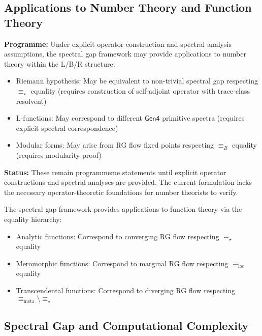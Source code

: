 \subsection{Applications to Number Theory and Function Theory}

\begin{conjecture}
\label{conj:number-theory-lbr}
\textbf{Programme:} Under explicit operator construction and spectral analysis assumptions, the spectral gap framework may provide applications to number theory within the L/B/R structure:
\begin{itemize}
\item Riemann hypothesis: May be equivalent to non-trivial spectral gap respecting $\equiv_\star$ equality (requires construction of self-adjoint operator with trace-class resolvent)
\item L-functions: May correspond to different $\mathsf{Gen4}$ primitive spectra (requires explicit spectral correspondence)
\item Modular forms: May arise from RG flow fixed points respecting $\equiv_B$ equality (requires modularity proof)
\end{itemize}

\textbf{Status:} These remain programmeme statements until explicit operator constructions and spectral analyses are provided. The current formulation lacks the necessary operator-theoretic foundations for number theorists to verify.
\end{conjecture}

\begin{theorem}
\label{thm:function-theory-lbr}
The spectral gap framework provides applications to function theory via the equality hierarchy:
\begin{itemize}
\item Analytic functions: Correspond to converging RG flow respecting $\equiv_\star$ equality
\item Meromorphic functions: Correspond to marginal RG flow respecting $\equiv_{\text{loc}}$ equality
\item Transcendental functions: Correspond to diverging RG flow respecting $\equiv_{\text{meta}} \setminus \equiv_\star$
\end{itemize}
\end{theorem}

\subsection{Spectral Gap and Computational Complexity}

